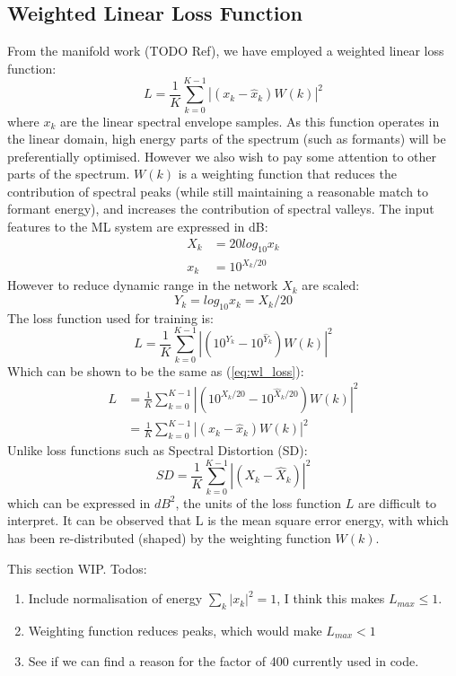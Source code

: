 \documentclass{article}
\begin{document}
\subsection{Weighted Linear Loss Function}

From the manifold work (TODO Ref), we have employed a weighted linear loss function:
\begin{equation}
\label{eq:wl_loss}
L = \frac{1}{K}\sum_{k=0}^{K-1}|(x_k-\hat{x}_k)W(k)|^2
\end{equation}
where $x_k$ are the linear spectral envelope samples. As this function operates in the linear domain, high energy parts of the spectrum (such as formants) will be preferentially optimised. However we also wish to pay some attention to other parts of the spectrum. $W(k)$ is a weighting function that reduces the contribution of spectral peaks (while still maintaining a reasonable match to formant energy), and increases the contribution of spectral valleys.
The input features to the ML system are expressed in dB:
\begin{equation}
\begin{split}
X_k &= 20log_{10}x_k \\
x_k &= 10^{X_k/20}
\end{split}
\end{equation}
However to reduce dynamic range in the network $X_k$ are scaled:
\begin{equation}
Y_k = log_{10}x_k = X_k/20
\end{equation}
The loss function used for training is:
\begin{equation}
L = \frac{1}{K}\sum_{k=0}^{K-1} | ( 10^{Y_k} - 10^{\hat{Y}_k} )W(k)|^2
\end{equation}
Which can be shown to be the same as (\ref{eq:wl_loss}):
\begin{equation}
\begin{split}
L &= \frac{1}{K}\sum_{k=0}^{K-1}|(10^{X_k/20} - 10^{\hat{X}_k/20})W(k)|^2 \\
  &= \frac{1}{K}\sum_{k=0}^{K-1}|(x_k - \hat{x}_k)W(k)|^2
\end{split}
\end{equation}
Unlike loss functions such as Spectral Distortion (SD):
\begin{equation}
\label{eq:sd_loss}
SD = \frac{1}{K}\sum_{k=0}^{K-1}|(X_k - \hat{X}_k)|^2
\end{equation}
which can be expressed in $dB^2$, the units of the loss function $L$ are difficult to interpret.  It can be observed that L is the mean square error energy, with which has been re-distributed (shaped) by the weighting function $W(k)$. 

This section WIP. Todos:
\begin{enumerate}
\item Include normalisation of energy $\sum_k |x_k|^2 = 1$, I think this makes $L_{max} \le 1$.
\item Weighting function reduces peaks, which would make $L_{max}<1$
\item See if we can find a reason for the factor of 400 currently used in code.
\end{enumerate}
\end{document}
